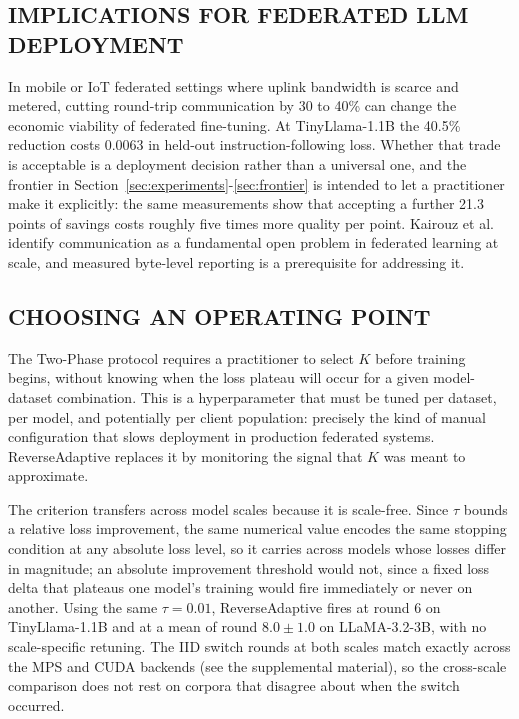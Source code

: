 \subsection{IMPLICATIONS FOR FEDERATED LLM DEPLOYMENT}
In mobile or IoT federated settings where uplink bandwidth is scarce and metered, cutting round-trip communication by 30 to 40\% can change the economic viability of federated fine-tuning. At TinyLlama-1.1B the 40.5\% reduction costs 0.0063 in held-out instruction-following loss. Whether that trade is acceptable is a deployment decision rather than a universal one, and the frontier in Section~\ref{sec:experiments}-\ref{sec:frontier} is intended to let a practitioner make it explicitly: the same measurements show that accepting a further 21.3 points of savings costs roughly five times more quality per point. Kairouz et al. \cite{kairouz2021advances} identify communication as a fundamental open problem in federated learning at scale, and measured byte-level reporting is a prerequisite for addressing it.

\subsection{CHOOSING AN OPERATING POINT}
The Two-Phase protocol requires a practitioner to select $K$ before training begins, without knowing when the loss plateau will occur for a given model-dataset combination. This is a hyperparameter that must be tuned per dataset, per model, and potentially per client population: precisely the kind of manual configuration that slows deployment in production federated systems. ReverseAdaptive replaces it by monitoring the signal that $K$ was meant to approximate.

The criterion transfers across model scales because it is scale-free. Since $\tau$ bounds a relative loss improvement, the same numerical value encodes the same stopping condition at any absolute loss level, so it carries across models whose losses differ in magnitude; an absolute improvement threshold would not, since a fixed loss delta that plateaus one model's training would fire immediately or never on another. Using the same $\tau{=}0.01$, ReverseAdaptive fires at round 6 on TinyLlama-1.1B and at a mean of round $8.0 \pm 1.0$ on LLaMA-3.2-3B, with no scale-specific retuning. The IID switch rounds at both scales match exactly across the MPS and CUDA backends (see the supplemental material), so the cross-scale comparison does not rest on corpora that disagree about when the switch occurred.

